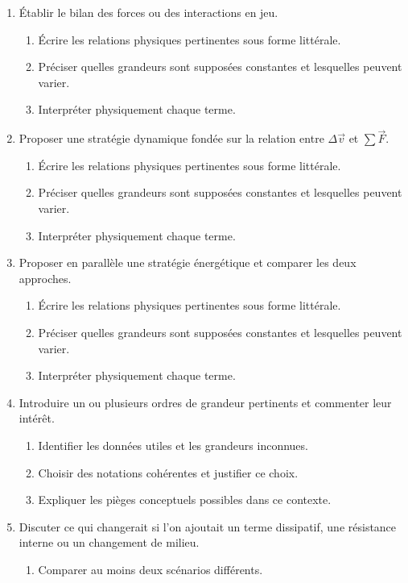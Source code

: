 \documentclass[11pt,a4paper]{article}
\begin{document}
\begin{enumerate}[label=\textbf{Très long \arabic*.},leftmargin=*]
\begin{enumerate}[label=\textbf{\arabic*)}]
\begin{enumerate}[label=\alph*)]
\end{enumerate}
\item Établir le bilan des forces ou des interactions en jeu.
\begin{enumerate}[label=\alph*)]
\item Écrire les relations physiques pertinentes sous forme littérale.
\item Préciser quelles grandeurs sont supposées constantes et lesquelles peuvent varier.
\item Interpréter physiquement chaque terme.
\end{enumerate}
\item Proposer une stratégie dynamique fondée sur la relation entre $\Delta\vec v$ et $\sum\vec F$.
\begin{enumerate}[label=\alph*)]
\item Écrire les relations physiques pertinentes sous forme littérale.
\item Préciser quelles grandeurs sont supposées constantes et lesquelles peuvent varier.
\item Interpréter physiquement chaque terme.
\end{enumerate}
\item Proposer en parallèle une stratégie énergétique et comparer les deux approches.
\begin{enumerate}[label=\alph*)]
\item Écrire les relations physiques pertinentes sous forme littérale.
\item Préciser quelles grandeurs sont supposées constantes et lesquelles peuvent varier.
\item Interpréter physiquement chaque terme.
\end{enumerate}
\item Introduire un ou plusieurs ordres de grandeur pertinents et commenter leur intérêt.
\begin{enumerate}[label=\alph*)]
\item Identifier les données utiles et les grandeurs inconnues.
\item Choisir des notations cohérentes et justifier ce choix.
\item Expliquer les pièges conceptuels possibles dans ce contexte.
\end{enumerate}
\item Discuter ce qui changerait si l'on ajoutait un terme dissipatif, une résistance interne ou un changement de milieu.
\begin{enumerate}[label=\alph*)]
\item Comparer au moins deux scénarios différents.

\end{enumerate}
\end{enumerate}
\end{enumerate}
\end{document}
